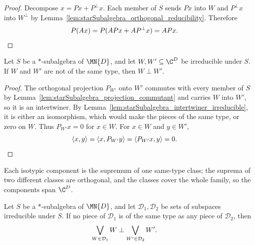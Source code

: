 \begin{proof}
    \leanok
    Decompose $x=Px+P^\perp x$. Each member of $S$ sends $Px$ into $W$ and
    $P^\perp x$ into $W^\perp$ by
    Lemma~\ref{lem:starSubalgebra_orthogonal_reducibility}. Therefore
    \begin{align}
        P(Ax)
        &=P(APx+AP^\perp x)
          =APx.
        \notag
    \end{align}
\end{proof}

\begin{lemma}%
    \label{lem:starSubalgebra_isOrtho_not_sameIsotype}
    \leanok
    Let $S$ be a $*$-subalgebra of $\MN{D}$, and let
    $W,W'\subseteq\C^D$ be irreducible under $S$. If $W$ and $W'$ are
    not of the same type, then $W\perp W'$.
\end{lemma}

\begin{proof}
    \leanok
    The orthogonal projection $P_{W'}$ onto $W'$ commutes with every member
    of $S$ by Lemma~\ref{lem:starSubalgebra_projection_commutant} and
    carries $W$ into $W'$, so it is an intertwiner. By
    Lemma~\ref{lem:starSubalgebra_intertwiner_irreducible}, it is either an
    isomorphism, which would make the pieces of the same type, or zero on
    $W$. Thus $P_{W'}x=0$ for $x\in W$. For $x\in W$ and $y\in W'$,
    \begin{align}
        \langle x,y\rangle
        &=\langle x,P_{W'}y\rangle
          =\langle P_{W'}x,y\rangle
          =0.
        \notag
    \end{align}
\end{proof}

Each isotypic component is the supremum of one same-type class; the suprema
of two different classes are orthogonal, and the classes cover the whole
family, so the components span $\C^D$.

\begin{lemma}%
    \label{lem:starSubalgebra_isOrtho_sSup_not_sameIsotype}
    \leanok
    Let $S$ be a $*$-subalgebra of $\MN{D}$, and let
    $\mathcal D_1,\mathcal D_2$ be sets of subspaces irreducible under $S$.
    If no piece of $\mathcal D_1$ is of the same type as any piece of
    $\mathcal D_2$, then
    \begin{align}
        \bigvee_{W\in\mathcal D_1}W
        &\perp
        \bigvee_{W'\in\mathcal D_2}W'.
        \notag
    \end{align}
\end{lemma}

